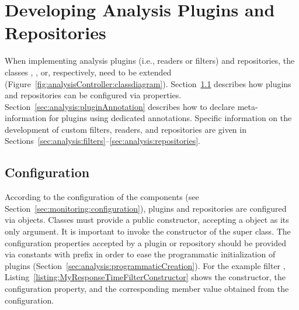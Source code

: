 \section{Developing Analysis Plugins and Repositories}\label{sec:analysis:plugins}

When implementing analysis plugins (i.e., readers or filters) and repositories, %
the classes , , or, %
respectively,  need to be extended %
(Figure~\ref{fig:analysisController:classdiagram}). %
Section~\ref{sec:analysis:configuration} describes how plugins and repositories %
can be configured via properties. %
Section~\ref{sec:analysis:pluginAnnotation} %
describes how to declare meta-information for plugins using %
dedicated annotations. %
Specific information on the development of custom filters, readers, and repositories %
are given in Sections~\ref{sec:analysis:filters}--\ref{sec:analysis:repositories}. %


\subsection{Configuration}\label{sec:analysis:configuration}

\noindent According to the %
configuration of the \KiekerMonitoringPart{} components (see Section~\ref{sec:monitoring:configuration}),
plugins and repositories are configured via  objects. Classes must %
provide a public constructor, accepting a  object as %
its only argument. It is important to invoke the constructor of the super class. %
The configuration properties accepted by a plugin or repository should be provided via  %
constants with prefix  in order to ease the %
programmatic initialization of plugins (Section~\ref{sec:analysis:programmaticCreation}). %
For the example filter ,
Listing~\ref{listing:MyResponseTimeFilterConstructor} shows the constructor,
the configuration property, and the corresponding member value obtained from the %
configuration.

